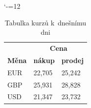 \documentclass[a4paper, 11pt]{article}
\begin{document}
			\bigskip
			\begin{table}[h]
				\catcode`-=12
				\centering
				\begin{tabular}{|l|ll|}
					\hline
					\multicolumn{1}{|c|}{\textbf{}} & \multicolumn{2}{c|}{\textbf{Cena}}                    \\ \cline{2-3} 
					\textbf{Měna} & \multicolumn{1}{l|}{\textbf{nákup}} & \textbf{prodej} \\ \hline
					EUR            & \multicolumn{1}{l|}{22,705}          & 25,242          \\
					GBP            & \multicolumn{1}{l|}{25,931}          & 28,828          \\
					USD            & \multicolumn{1}{l|}{21,347}          & 23,732          \\ \hline
				\end{tabular}
				\caption{Tabulka kurzů k~dnešnímu dni}\label{tab:meny}
			\end{table}
						
\end{document}
